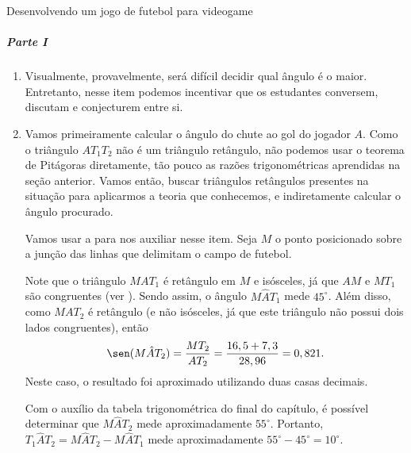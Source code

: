 \begin{answer}{Desenvolvendo um jogo de futebol para videogame}
{\subparagraph{Parte I}

\begin{enumerate}\small

    \item Visualmente, provavelmente, será difícil decidir qual ângulo é o maior. Entretanto, nesse item podemos incentivar que os estudantes conversem, discutam e conjecturem entre si.
    
    \item{}
    Vamos primeiramente calcular o ângulo do chute ao gol do jogador $A$. Como o triângulo $AT_1T_2$ não é um triângulo retângulo, não podemos usar o teorema de Pitágoras diretamente, tão pouco as razões trigonométricas aprendidas na seção anterior. Vamos então, buscar triângulos retângulos presentes na situação para aplicarmos a teoria que conhecemos, e indiretamente calcular o ângulo procurado.
    
    Vamos usar a  para nos auxiliar nesse item. Seja $M$ o ponto posicionado sobre a junção das linhas que delimitam o campo de futebol.


    Note que o triângulo $MAT_1$ é retângulo em $M$ e isósceles, já que $AM$ e $MT_1$ são congruentes (ver ). Sendo assim, o ângulo $M\hat{A}T_1$ mede $45^\circ$. Além disso, como $MAT_2$ é retângulo (e não isósceles, já que este triângulo não possui dois lados congruentes), então 
    $$\sen(M\hat{A}T_2)=\frac{MT_2}{AT_2}=\frac{16,5+7,3}{28,96}=0,821.$$
    Neste caso, o resultado foi aproximado utilizando duas casas decimais.
    
    Com o auxílio da tabela trigonométrica do final do capítulo, é possível determinar que $M\hat{A}T_2$ mede aproximadamente $55^\circ$. Portanto, $T_1\hat{A}T_2=M\hat{A}T_2-M\hat{A}T_1$ mede aproximadamente $55^\circ-45^\circ=10^\circ$.
    

\end{enumerate}}
\end{answer}

